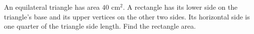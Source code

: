 An equilateral triangle has area $ 40\text{ cm}^2 $. A rectangle has its lower side on the triangle's base and its upper vertices on the other two sides. Its horizontal side is one quarter of the triangle side length. Find the rectangle area.
